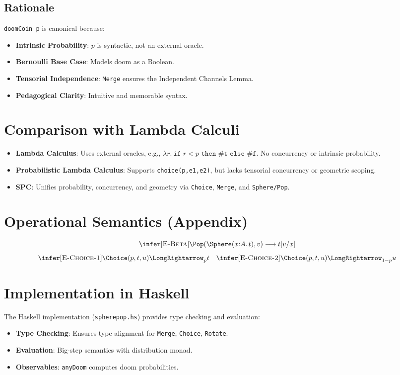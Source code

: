 \documentclass{article}
\begin{document}
\subsection{Rationale}
\texttt{doomCoin p} is canonical because:
\begin{itemize}
    \item \textbf{Intrinsic Probability}: $p$ is syntactic, not an external oracle.
    \item \textbf{Bernoulli Base Case}: Models doom as a Boolean.
    \item \textbf{Tensorial Independence}: \texttt{Merge} ensures the Independent Channels Lemma.
    \item \textbf{Pedagogical Clarity}: Intuitive and memorable syntax.
\end{itemize}

\section{Comparison with Lambda Calculi}
\begin{itemize}
    \item \textbf{Lambda Calculus}: Uses external oracles, e.g., $\lambda r.\ \texttt{if } r < p \texttt{ then \#t else \#f}$. No concurrency or intrinsic probability.
    \item \textbf{Probabilistic Lambda Calculus}: Supports \texttt{choice(p,e1,e2)}, but lacks tensorial concurrency or geometric scoping.
    \item \textbf{SPC}: Unifies probability, concurrency, and geometry via \texttt{Choice}, \texttt{Merge}, and \texttt{Sphere/Pop}.
\end{itemize}

\section{Operational Semantics (Appendix)}
\[
\infer[\textsc{E-Beta}]{\Pop(\Sphere(x{:}A.\,t), v) \longrightarrow t[v/x]}{}
\]
\[
\infer[\textsc{E-Choice-1}]{\Choice(p,t,u) \LongRightarrow_p t}{} \quad
\infer[\textsc{E-Choice-2}]{\Choice(p,t,u) \LongRightarrow_{1-p} u}{}
\]

\section{Implementation in Haskell}
The Haskell implementation (\texttt{spherepop.hs}) provides type checking and evaluation:
\begin{itemize}
    \item \textbf{Type Checking}: Ensures type alignment for \texttt{Merge}, \texttt{Choice}, \texttt{Rotate}.
    \item \textbf{Evaluation}: Big-step semantics with distribution monad.
    \item \textbf{Observables}: \texttt{anyDoom} computes doom probabilities.
\end{itemize}
\end{document}

